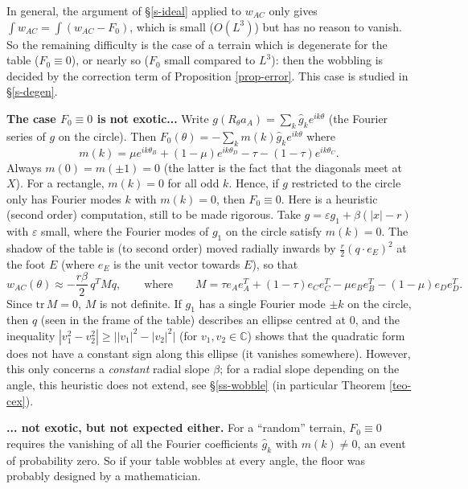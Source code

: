 \documentclass[a4paper,11pt,twoside,leqno]{article}
\newcommand{\eps}[0]{\varepsilon}
\numberwithin{equation}{section}
\begin{document}
In general, the argument of \S{}\ref{s-ideal} applied to $w_{AC}$ only gives $\int w_{AC} = \int (w_{AC} - F_0)$, which is small ($O(L^3)$) but has no reason to vanish. So the remaining difficulty is the case of a terrain which is degenerate for the table ($F_0 \equiv 0$), or nearly so ($F_0$ small compared to $L^3$): then the wobbling is decided by the correction term of Proposition \ref{prop-error}. This case is studied in \S{}\ref{s-degen}.

\begin{rmk}\label{rmk-fourier}
{\bfseries The case $F_0 \equiv 0$ is not exotic...} Write $g(R_\theta a_A) = \sum_k \hat g_k e^{ik\theta}$ (the Fourier series of $g$ on the circle). Then $F_0(\theta) = -\sum_k m(k) \hat g_k e^{ik\theta}$ where
\[
m(k) = \mu e^{ik\theta_B} + (1-\mu) e^{ik\theta_D} - \tau - (1-\tau) e^{ik\theta_C}.
\]
Always $m(0) = m(\pm 1) = 0$ (the latter is the fact that the diagonals meet at $X$). For a rectangle, $m(k) = 0$ for all odd $k$. Hence, if $g$ restricted to the circle only has Fourier modes $k$ with $m(k)=0$, then $F_0 \equiv 0$. Here is a heuristic (second order) computation, still to be made rigorous. Take $g = \eps g_1 + \beta(|x| - r)$ with $\eps$ small, where the Fourier modes of $g_1$ on the circle satisfy $m(k) = 0$. The shadow of the table is (to second order) moved radially inwards by $\frac{r}{2}(q\cdot e_E)^2$ at the foot $E$ (where $e_E$ is the unit vector towards $E$), so that
\[
w_{AC}(\theta) \approx -\frac{r\beta}{2}\, q^{T} M q,
\qquad \text{where} \qquad
M = \tau e_A e_A^T + (1-\tau) e_C e_C^T - \mu e_B e_B^T - (1-\mu) e_D e_D^T.
\]
Since $\mathrm{tr}\, M = 0$, $M$ is not definite. If $g_1$ has a single Fourier mode $\pm k$ on the circle, then $q$ (seen in the frame of the table) describes an ellipse centred at $0$, and the inequality $|v_1^2 - v_2^2| \geq \big| |v_1|^2 - |v_2|^2 \big|$ (for $v_1,v_2 \in \mathbb{C}$) shows that the quadratic form does not have a constant sign along this ellipse (it vanishes somewhere). However, this only concerns a \emph{constant} radial slope $\beta$; for a radial slope depending on the angle, this heuristic does not extend, see \S{}\ref{ss-wobble} (in particular Theorem \ref{teo-cex}).

{\bfseries ... not exotic, but not expected either.} For a ``random'' terrain, $F_0 \equiv 0$ requires the vanishing of all the Fourier coefficients $\hat g_k$ with $m(k) \neq 0$, an event of probability zero. So if your table wobbles at every angle, the floor was probably designed by a mathematician.
\end{rmk}
\end{document}
